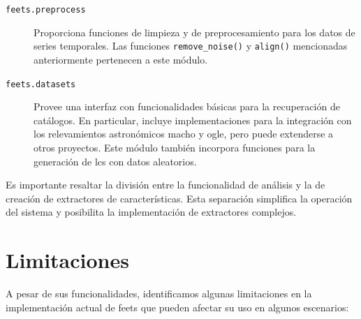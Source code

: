 \begin{description}
    \item[\texttt{feets.preprocess}] Proporciona funciones de limpieza y de preprocesamiento para los datos de series temporales. Las funciones \texttt{remove\_noise()} y \texttt{align()} mencionadas anteriormente pertenecen a este módulo.

    \item[\texttt{feets.datasets}] Provee una interfaz con funcionalidades básicas para la recuperación de catálogos. En particular, incluye implementaciones para la integración con los relevamientos astronómicos \gls{macho} y \gls{ogle}, pero puede extenderse a otros proyectos. Este módulo también incorpora funciones para la generación de \glspl{lc} con datos aleatorios.
\end{description}

Es importante resaltar la división entre la funcionalidad de análisis y la de creación de extractores de características. Esta separación simplifica la operación del sistema y posibilita la implementación de extractores complejos.

\section{Limitaciones}

A pesar de sus funcionalidades, identificamos algunas limitaciones en la implementación actual de \gls{feets} que pueden afectar su uso en algunos escenarios:

